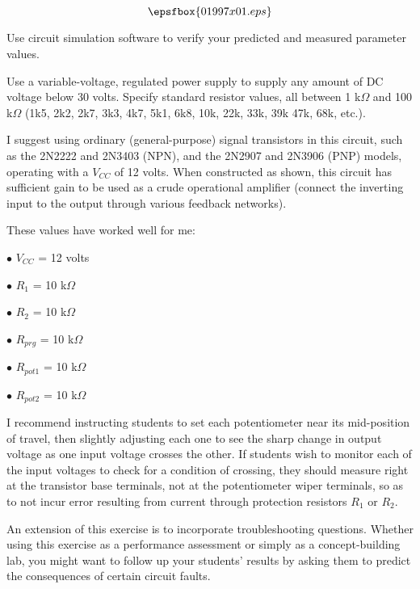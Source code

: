 

$$\epsfbox{01997x01.eps}$$

\vfil \eject






Use circuit simulation software to verify your predicted and measured parameter values.







Use a variable-voltage, regulated power supply to supply any amount of DC voltage below 30 volts.  Specify standard resistor values, all between 1 k$\Omega$ and 100 k$\Omega$ (1k5, 2k2, 2k7, 3k3, 4k7, 5k1, 6k8, 10k, 22k, 33k, 39k 47k, 68k, etc.).

I suggest using ordinary (general-purpose) signal transistors in this circuit, such as the 2N2222 and 2N3403 (NPN), and the 2N2907 and 2N3906 (PNP) models, operating with a $V_{CC}$ of 12 volts.  When constructed as shown, this circuit has sufficient gain to be used as a crude operational amplifier (connect the inverting input to the output through various feedback networks).

These values have worked well for me:

\medskip
\goodbreak
\item{$\bullet$} $V_{CC}$ = 12 volts
\item{$\bullet$} $R_1$ = 10 k$\Omega$
\item{$\bullet$} $R_2$ = 10 k$\Omega$
\item{$\bullet$} $R_{prg}$ = 10 k$\Omega$
\item{$\bullet$} $R_{pot1}$ = 10 k$\Omega$
\item{$\bullet$} $R_{pot2}$ = 10 k$\Omega$
\medskip

I recommend instructing students to set each potentiometer near its mid-position of travel, then slightly adjusting each one to see the sharp change in output voltage as one input voltage crosses the other.  If students wish to monitor each of the input voltages to check for a condition of crossing, they should measure right at the transistor base terminals, not at the potentiometer wiper terminals, so as to not incur error resulting from current through protection resistors $R_1$ or $R_2$.

An extension of this exercise is to incorporate troubleshooting questions.  Whether using this exercise as a performance assessment or simply as a concept-building lab, you might want to follow up your students' results by asking them to predict the consequences of certain circuit faults.




